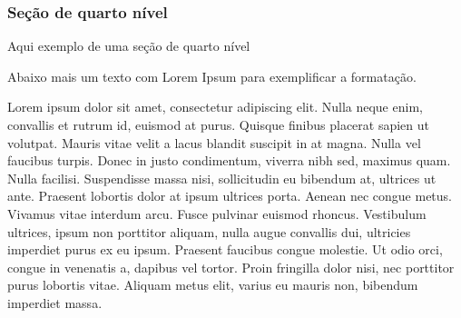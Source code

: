 \subsubsection{Seção de quarto nível}

Aqui exemplo de uma seção de quarto nível

Abaixo mais um texto com Lorem Ipsum para exemplificar a formatação.

Lorem ipsum dolor sit amet, consectetur adipiscing elit. Nulla neque enim, convallis et rutrum id, euismod at purus. Quisque finibus placerat sapien ut volutpat. Mauris vitae velit a lacus blandit suscipit in at magna. Nulla vel faucibus turpis. Donec in justo condimentum, viverra nibh sed, maximus quam. Nulla facilisi. Suspendisse massa nisi, sollicitudin eu bibendum at, ultrices ut ante. Praesent lobortis dolor at ipsum ultrices porta. Aenean nec congue metus. Vivamus vitae interdum arcu. Fusce pulvinar euismod rhoncus. Vestibulum ultrices, ipsum non porttitor aliquam, nulla augue convallis dui, ultricies imperdiet purus ex eu ipsum. Praesent faucibus congue molestie. Ut odio orci, congue in venenatis a, dapibus vel tortor. Proin fringilla dolor nisi, nec porttitor purus lobortis vitae. Aliquam metus elit, varius eu mauris non, bibendum imperdiet massa.

